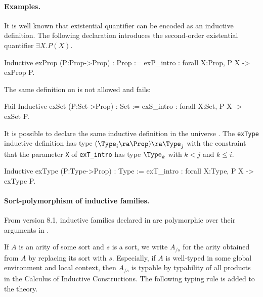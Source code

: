\paragraph{Examples.}
It is well known that existential quantifier can be encoded as an
inductive definition.
The following declaration introduces the second-order existential
quantifier $\exists X.P(X)$.
\begin{coq_example*}
Inductive exProp (P:Prop->Prop) : Prop 
  := exP_intro : forall X:Prop, P X -> exProp P.
\end{coq_example*}
The same definition on \Set{} is not allowed and fails:
\begin{coq_example}
Fail Inductive exSet (P:Set->Prop) : Set
  := exS_intro : forall X:Set, P X -> exSet P.
\end{coq_example}
It is possible to declare the same inductive definition in the
universe \Type. 
The \texttt{exType} inductive definition has type  $(\Type_i \ra\Prop)\ra
\Type_j$ with the constraint that the parameter \texttt{X} of \texttt{exT\_intro} has type $\Type_k$ with $k<j$ and $k\leq i$.
\begin{coq_example*}
Inductive exType (P:Type->Prop) : Type
  := exT_intro : forall X:Type, P X -> exType P.
\end{coq_example*}

\paragraph[Sort-polymorphism of inductive families.]{Sort-polymorphism of inductive families.}
\label{Sort-polymorphism-inductive}

From {\Coq} version 8.1, inductive families declared in {\Type} are
polymorphic over their arguments in {\Type}.

If $A$ is an arity of some sort and $s$ is a sort, we write $A_{/s}$ for the arity
obtained from $A$ by replacing its sort with $s$. Especially, if $A$
is well-typed in some global environment and local context, then $A_{/s}$ is typable
by typability of all products in the Calculus of Inductive Constructions.
The following typing rule is added to the theory.

